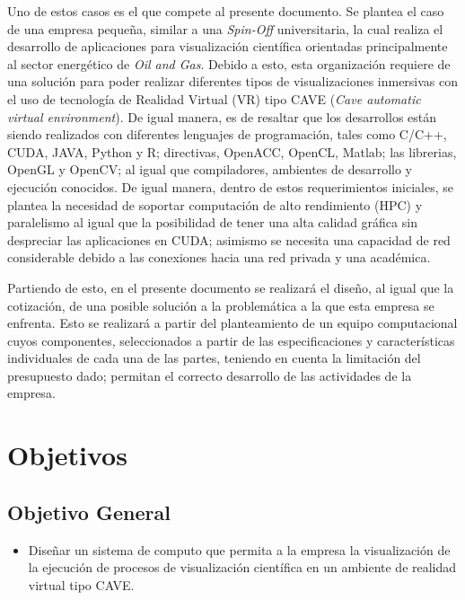 \documentclass[conference,onecolumn]{IEEEtran}
\begin{document}
Uno de estos casos es el que compete al presente documento. Se plantea el caso de una empresa pequeña, similar a una \textit{Spin-Off} universitaria, la cual realiza el desarrollo de aplicaciones para visualización científica orientadas principalmente al sector energético de \textit{Oil and Gas}. Debido a esto, esta organización requiere de una solución para poder realizar diferentes tipos de visualizaciones inmersivas con el uso de tecnología de Realidad Virtual (VR) tipo CAVE (\textit{Cave automatic virtual environment}). De igual manera, es de resaltar que los desarrollos están siendo realizados con diferentes lenguajes de programación, tales como C/C++, CUDA, JAVA, Python y R; directivas, OpenACC, OpenCL, Matlab; las librerias, OpenGL y OpenCV; al igual que compiladores, ambientes de desarrollo y ejecución conocidos. De igual manera, dentro de estos requerimientos iniciales, se plantea la necesidad de soportar computación de alto rendimiento (HPC) y paralelismo al igual que la posibilidad de tener una alta calidad gráfica sin despreciar las aplicaciones en CUDA; asimismo se necesita una capacidad de red considerable debido a las conexiones hacia una red privada y una académica.
\cite{arqCom} \medbreak \medbreak

Partiendo de esto, en el presente documento se realizará el diseño, al igual que la cotización, de una posible solución a la problemática a la que esta empresa se enfrenta. Esto se realizará a partir del planteamiento de un equipo computacional cuyos componentes, seleccionados a partir de las especificaciones y características individuales de cada una de las partes, teniendo en cuenta la limitación del presupuesto dado; permitan el correcto desarrollo de las actividades de la empresa. \medbreak \medbreak

\section{Objetivos}
\subsection{Objetivo General}

\begin{itemize}
    \item Diseñar un sistema de computo que permita a la empresa la visualización de la ejecución de procesos de visualización científica en un ambiente de realidad virtual tipo CAVE. \medbreak
\end{itemize}
\end{document}
